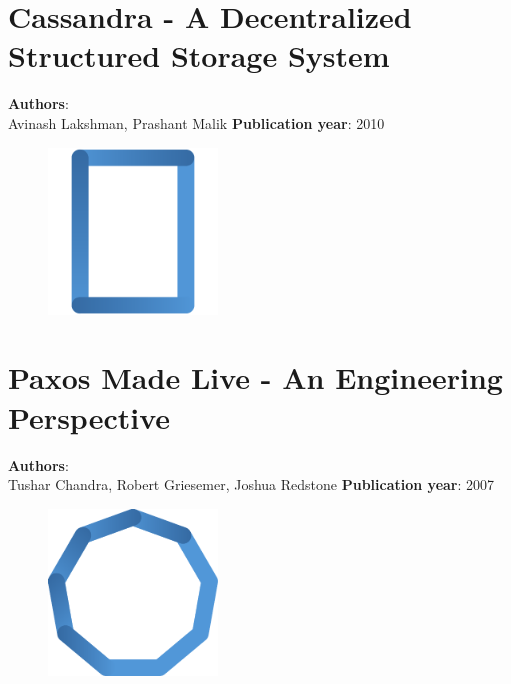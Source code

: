 \documentclass[11pt,fleqn]{book} %
\begin{document}
\chapter{Cassandra - A Decentralized Structured Storage System}
\vspace*{-7mm}
\Large \textbf{Authors}: \\
Avinash Lakshman, Prashant Malik
\newline\newline
\textbf{Publication year}: 2010
\begin{figure}[b]
    \centering
    \includegraphics[width=0.4\textwidth]{distributed-systems-rectangle-blue.pdf}
\end{figure}


\chapter{Paxos Made Live - An Engineering Perspective}
\vspace*{-7mm}
\Large \textbf{Authors}: \\
Tushar Chandra, Robert Griesemer, Joshua Redstone
\newline\newline
\textbf{Publication year}: 2007
\begin{figure}[b]
    \centering
    \includegraphics[width=0.4\textwidth]{distributed-systems-blue.pdf}
\end{figure}

\end{document}
